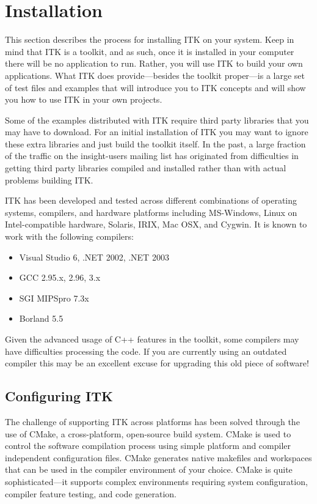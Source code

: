 \chapter{Installation}
\label{chapter:Installation}

This section describes the process for installing ITK on your system. Keep in
mind that ITK is a toolkit, and as such, once it is installed in your computer
there will be no application to run. Rather, you will use ITK to build your
own applications. What ITK does provide---besides the toolkit proper---is a
large set of test files and examples that will introduce you to ITK concepts
and will show you how to use ITK in your own projects.

Some of the examples distributed with ITK require third party libraries that
you may have to download. For an initial installation of ITK you may want to
ignore these extra libraries and just build the toolkit itself. In the past,
a large fraction of the traffic on the insight-users mailing list has
originated from
difficulties in getting third party libraries compiled and installed rather
than with actual problems building ITK.

ITK has been developed and tested across different combinations of
operating systems, compilers, and hardware platforms including
MS-Windows, Linux on Intel-compatible hardware, Solaris, IRIX, Mac
OSX, and Cygwin.  It is known to work with the following compilers:

\begin{itemize}
\item Visual Studio 6, .NET 2002, .NET 2003
\item GCC 2.95.x, 2.96, 3.x
\item SGI MIPSpro 7.3x
\item Borland 5.5
\end{itemize}

Given the advanced usage of C++ features in the toolkit, some
compilers may have difficulties processing the code. If you are
currently using an outdated compiler this may be an excellent excuse
for upgrading this old piece of software!

\section{Configuring ITK}
\label{sec:ConfiguringITK}

 
The challenge of supporting ITK across platforms has been solved through the
use of CMake, a cross-platform, open-source build system. CMake is used to
control the software compilation process using simple platform and compiler
independent configuration files.  CMake generates native makefiles and
workspaces that can be used in the compiler environment of your choice. CMake
is quite sophisticated---it supports complex environments requiring system
configuration, compiler feature testing, and code generation.

